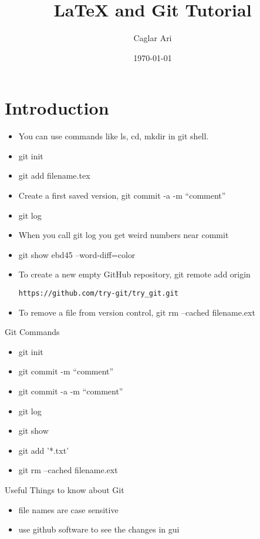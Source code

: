 \documentclass[12pt]{article}
\begin{document}
\title{\LaTeX\; and Git Tutorial}
\author{Caglar Ari}
\date{\today}
\maketitle
{}

\section{Introduction}
\begin{itemize}
\item You can use commands like ls, cd, mkdir in git shell.
\item git init
\item git add filename.tex
\item Create a first saved version, git commit -a -m "`comment"'
\item git log
\item When you call git log you get weird numbers near commit
\item git show ebd45 --word-diff=color
\item To create a new empty GitHub repository, git remote add origin \begin{verbatim}https://github.com/try-git/try_git.git \end{verbatim} 
\item To remove a file from version control, git rm --cached filename.ext
\end{itemize}

Git Commands
\begin{itemize}
\item git init
\item git commit -m "`comment"'
\item git commit -a -m "`comment"'
\item git log
\item git show
\item git add '*.txt'
\item git rm --cached filename.ext
\end{itemize}

Useful Things to know about Git
\begin{itemize}
\item file names are case sensitive
\item use github software to see the changes in gui
\end{itemize}
\end{document}
